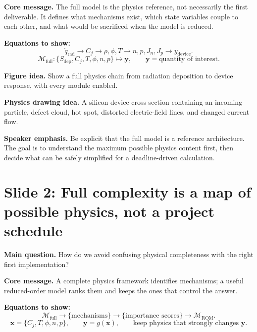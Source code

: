 \documentclass[11pt]{article}
\begin{document}
\textbf{Core message.} The full model is the physics reference, not necessarily the first deliverable. It defines what mechanisms exist, which state variables couple to each other, and what would be sacrificed when the model is reduced.

\textbf{Equations to show:}
\begin{equation*}
\dot{q}_{\mathrm{rad}} \longrightarrow C_j \longrightarrow \rho,\phi,T \longrightarrow n,p,J_n,J_p \longrightarrow y_{\mathrm{device}}.
\end{equation*}
\begin{equation*}
\mathcal{M}_{\mathrm{full}}:
\{S_{\mathrm{dep}},C_j,T,\phi,n,p\}\mapsto \mathbf{y},
\qquad
\mathbf{y}=\text{quantity of interest}.
\end{equation*}

\textbf{Figure idea.} Show a full physics chain from radiation deposition to device response, with every module enabled.

\textbf{Physics drawing idea.} A silicon device cross section containing an incoming particle, defect cloud, hot spot, distorted electric-field lines, and changed current flow.

\textbf{Speaker emphasis.} Be explicit that the full model is a reference architecture. The goal is to understand the maximum possible physics content first, then decide what can be safely simplified for a deadline-driven calculation.

\section{Slide 2: Full complexity is a map of possible physics, not a project schedule}
\begin{physicsbox}
\textbf{Main question.} How do we avoid confusing physical completeness with the right first implementation?
\end{physicsbox}

\textbf{Core message.} A complete physics framework identifies mechanisms; a useful reduced-order model ranks them and keeps the ones that control the answer.

\textbf{Equations to show:}
\begin{equation*}
\mathcal{M}_{\mathrm{full}}
\rightarrow
\{\text{mechanisms}\}
\rightarrow
\{\text{importance scores}\}
\rightarrow
\mathcal{M}_{\mathrm{ROM}}.
\end{equation*}
\begin{equation*}
\mathbf{x}=\{C_j,T,\phi,n,p\},
\qquad
\mathbf{y}=g(\mathbf{x}),
\qquad
\text{keep physics that strongly changes }\mathbf{y}.
\end{equation*}
\end{document}

